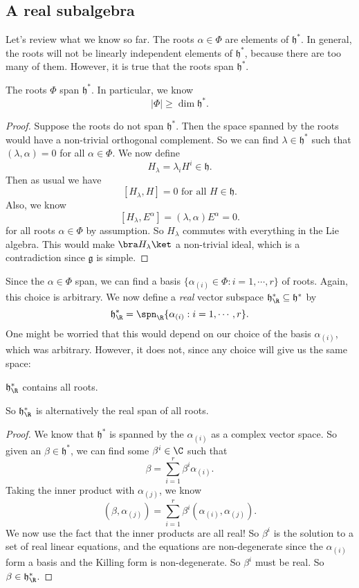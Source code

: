 \documentclass[a4paper]{article}
\begin{document}
\subsection{A real subalgebra}
Let's review what we know so far. The roots $\alpha \in \Phi$ are elements of $\mathfrak{h}^*$. In general, the roots will not be linearly independent elements of $\mathfrak{h}^*$, because there are too many of them. However, it is true that the roots span $\mathfrak{h}^*$.

\begin{prop}
  The roots $\Phi$ span $\mathfrak{h}^*$. In particular, we know
  \[
    |\Phi| \geq \dim \mathfrak{h}^*.
  \]
\end{prop}

\begin{proof}
  Suppose the roots do not span $\mathfrak{h}^*$. Then the space spanned by the roots would have a non-trivial orthogonal complement. So we can find $\lambda \in \mathfrak{h}^*$ such that $(\lambda, \alpha) = 0$ for all $\alpha \in \Phi$.
  We now define
  \[
    H_{\lambda} = \lambda_i H^i \in \mathfrak{h}.
  \]
  Then as usual we have
  \[
    [H_\lambda, H] = 0\text{ for all }H \in \mathfrak{h}.
  \]
  Also, we know
  \[
    [H_\lambda, E^\alpha] = (\lambda, \alpha) E^\alpha = 0.
  \]
  for all roots $\alpha \in \Phi$ by assumption. So $H_\lambda$ commutes with everything in the Lie algebra. This would make $\bra H_\lambda\ket$ a non-trivial ideal, which is a contradiction since $\mathfrak{g}$ is simple.
\end{proof}
Since the $\alpha \in \Phi$ span, we can find a basis $\{\alpha_{(i)} \in \Phi: i = 1, \cdots, r\}$ of roots. Again, this choice is arbitrary. We now define a \emph{real} vector subspace $\mathfrak{h}_\R^* \subseteq \mathfrak{h}^*$ by
\[
  \mathfrak{h}_\R^* = \spn_\R\{\alpha_{(i)}: i = 1, \cdots, r\}.
\]
One might be worried that this would depend on our choice of the basis $\alpha_{(i)}$, which was arbitrary. However, it does not, since any choice will give us the same space:
\begin{prop}
  $\mathfrak{h}_\R^*$ contains all roots.
\end{prop}
So $\mathfrak{h}_\R^*$ is alternatively the real span of all roots.

\begin{proof}
  We know that $\mathfrak{h}^*$ is spanned by the $\alpha_{(i)}$ as a complex vector space. So given an $\beta \in \mathfrak{h}^*$, we can find some $\beta^i \in \C$ such that
  \[
    \beta = \sum_{i = 1}^r \beta^i \alpha_{(i)}.
  \]
  Taking the inner product with $\alpha_{(j)}$, we know
  \[
    (\beta, \alpha_{(j)}) = \sum_{i = 1}^r \beta^i(\alpha_{(i)}, \alpha_{(j)}).
  \]
  We now use the fact that the inner products are all real! So $\beta^i$ is the solution to a set of real linear equations, and the equations are non-degenerate since the $\alpha_{(i)}$ form a basis and the Killing form is non-degenerate. So $\beta^i$ must be real. So $\beta \in \mathfrak{h}^*_\R$.
\end{proof}
\end{document}
